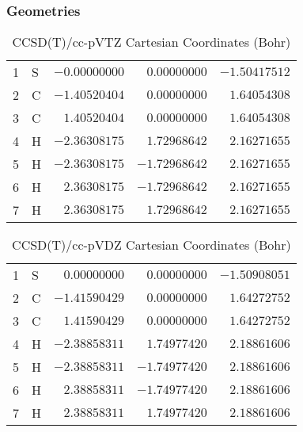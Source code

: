 \documentclass[10pt,oneside]{article}
\begin{document}
\clearpage

\subsection{\ \ \ }

\subsubsection*{Geometries}
\begin{table}[h!]
\centering
\caption{CCSD(T)/cc-pVTZ Cartesian Coordinates (Bohr)}
\begin{tabular}{llrrr}
1  & S  & $-0.00000000$ & $ 0.00000000$ & $-1.50417512$ \\
2  & C  & $-1.40520404$ & $ 0.00000000$ & $ 1.64054308$ \\
3  & C  & $ 1.40520404$ & $ 0.00000000$ & $ 1.64054308$ \\
4  & H  & $-2.36308175$ & $ 1.72968642$ & $ 2.16271655$ \\
5  & H  & $-2.36308175$ & $-1.72968642$ & $ 2.16271655$ \\
6  & H  & $ 2.36308175$ & $-1.72968642$ & $ 2.16271655$ \\
7  & H  & $ 2.36308175$ & $ 1.72968642$ & $ 2.16271655$ \\
\end{tabular}
\end{table}

\begin{table}[h!]
\centering
\caption{CCSD(T)/cc-pVDZ Cartesian Coordinates (Bohr)}
\begin{tabular}{llrrr}
1  & S  & $ 0.00000000$ & $ 0.00000000$ & $-1.50908051$ \\
2  & C  & $-1.41590429$ & $ 0.00000000$ & $ 1.64272752$ \\
3  & C  & $ 1.41590429$ & $ 0.00000000$ & $ 1.64272752$ \\
4  & H  & $-2.38858311$ & $ 1.74977420$ & $ 2.18861606$ \\
5  & H  & $-2.38858311$ & $-1.74977420$ & $ 2.18861606$ \\
6  & H  & $ 2.38858311$ & $-1.74977420$ & $ 2.18861606$ \\
7  & H  & $ 2.38858311$ & $ 1.74977420$ & $ 2.18861606$ \\
\end{tabular}
\end{table}
\end{document}
